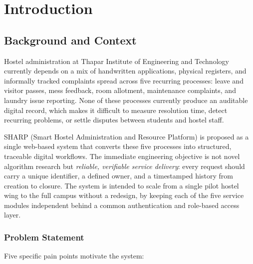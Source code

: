 \documentclass{tietreport}
\author{%
  \texttt{1024160097} Vaibhav Kansal \\
  \texttt{1024160138} Ali Ekram \\
  \texttt{1024160122} Riya Gupta \\
  \texttt{1024160118} Ayush Kamboj%
}
\begin{document}
\maketitle
\tableofcontents

\chapter{Introduction}

\section{Background and Context}

Hostel administration at Thapar Institute of Engineering and Technology
currently depends on a mix of handwritten applications, physical registers,
and informally tracked complaints spread across five recurring processes:
leave and visitor passes, mess feedback, room allotment, maintenance
complaints, and laundry issue reporting. None of these processes currently
produce an auditable digital record, which makes it difficult to measure
resolution time, detect recurring problems, or settle disputes between
students and hostel staff.

SHARP (Smart Hostel Administration and Resource Platform) is proposed as a
single web-based system that converts these five processes into structured,
traceable digital workflows. The immediate engineering objective is not
novel algorithm research but \emph{reliable, verifiable service delivery}:
every request should carry a unique identifier, a defined owner, and a
timestamped history from creation to closure. The system is intended to
scale from a single pilot hostel wing to the full campus without a
redesign, by keeping each of the five service modules independent behind a
common authentication and role-based access layer.

\subsection{Problem Statement}

Five specific pain points motivate the system:
\end{document}
